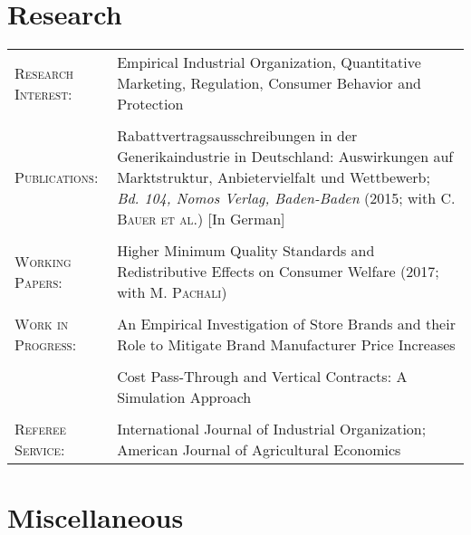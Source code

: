 \documentclass[a4paper,10pt]{article} %
\begin{document}

\section{Research}

\begin{tabular}{P{4.5cm} P{10cm}}
\textsc{Research Interest:} &  Empirical Industrial Organization, Quantitative Marketing, Regulation, Consumer Behavior and Protection \\
\\
\textsc{Publications:} &  Rabattvertragsausschreibungen in der Generikaindustrie in Deutschland: Auswirkungen auf Marktstruktur, Anbietervielfalt und Wettbewerb; \textit{Bd. 104, Nomos Verlag, Baden-Baden} (2015; with C. \textsc{Bauer et al.}) [In German] \\
\\
\textsc{Working Papers:} & Higher Minimum Quality Standards and Redistributive Effects on Consumer Welfare (2017; with M. \textsc{Pachali}) \\
\\
\textsc{Work in Progress:}  & An Empirical Investigation of Store Brands and their Role to Mitigate Brand Manufacturer Price Increases \\
\\
&Cost Pass-Through and Vertical Contracts: A Simulation Approach \\
\\
\textsc{Referee Service:}  & International Journal of Industrial Organization; American Journal of Agricultural Economics \\
\end{tabular}





\section{Miscellaneous}
\end{document}
